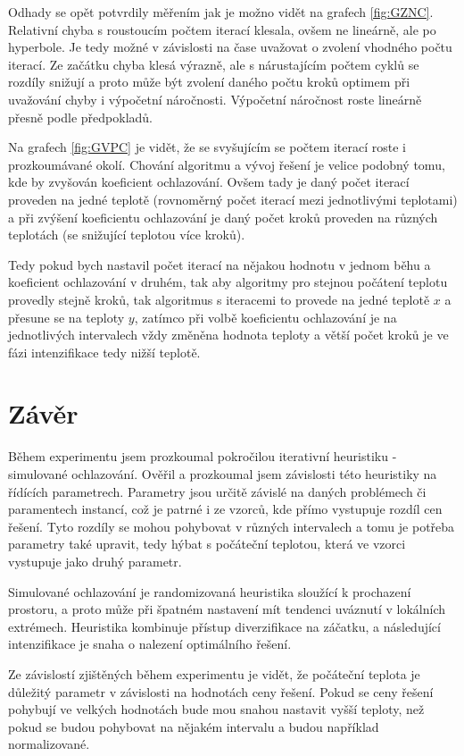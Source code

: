 \documentclass[11pt]{article}
\begin{document}
Odhady se opět potvrdily měřením jak je možno vidět na grafech \ref{fig:GZNC}. Relativní chyba s roustoucím počtem iterací klesala, ovšem ne lineárně, ale po hyperbole. Je tedy možné v závislosti na čase uvažovat o zvolení vhodného počtu iterací. Ze začátku chyba klesá výrazně, ale s nárustajícím počtem cyklů se rozdíly snižují a proto může být zvolení daného počtu kroků optimem při uvažování chyby i výpočetní náročnosti. Výpočetní náročnost roste lineárně přesně podle předpokladů.

Na grafech \ref{fig:GVPC} je vidět, že se svyšujícím se počtem iterací roste i prozkoumávané okolí. Chování algoritmu a vývoj řešení je velice podobný tomu, kde by zvyšován koeficient ochlazování. Ovšem tady je daný počet iterací proveden na jedné teplotě (rovnoměrný počet iterací mezi jednotlivými teplotami) a při zvýšení koeficientu ochlazování je daný počet kroků proveden na různých teplotách (se snižující teplotou více kroků). 

Tedy pokud bych nastavil počet iterací na nějakou hodnotu v jednom běhu a koeficient ochlazování v druhém, tak aby algoritmy pro stejnou počátení teplotu provedly stejně kroků, tak algoritmus s iteracemi to provede na jedné teplotě $x$ a přesune se na teploty $y$, zatímco při volbě koeficientu ochlazování je na jednotlivých intervalech vždy změněna hodnota teploty a větší počet kroků je ve fázi intenzifikace tedy nižší teplotě.
\section{Závěr}
Během experimentu jsem prozkoumal pokročilou iterativní heuristiku - simulované ochlazování. Ověřil a prozkoumal jsem závislosti této heuristiky na řídících parametrech. Parametry jsou určitě závislé na daných problémech či paramentech instancí, což je patrné i ze vzorců, kde přímo vystupuje rozdíl cen řešení. Tyto rozdíly se mohou pohybovat v různých intervalech a tomu je potřeba parametry také upravit, tedy hýbat s počáteční teplotou, která ve vzorci vystupuje jako druhý parametr. 

Simulované ochlazování je randomizovaná heuristika sloužící k prochazení prostoru, a proto může při špatném nastavení mít tendenci uváznutí v lokálních extrémech. Heuristika kombinuje přístup diverzifikace na záčatku, a následující intenzifikace je snaha o nalezení optimálního řešení. 

Ze závislostí zjištěných během experimentu je vidět, že počáteční teplota je důležitý parametr v závislosti na hodnotách ceny řešení. Pokud se ceny řešení pohybují ve velkých hodnotách bude mou snahou nastavit vyšší teploty, než pokud se budou pohybovat na nějakém intervalu a budou například normalizované. 
\end{document}
